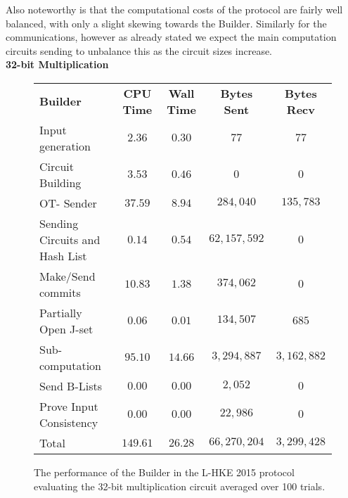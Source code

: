 \documentclass[ %
                    author={Nicholas Tutte},
                supervisor={Prof. Nigel Smart},
                    degree={MEng},
                     title={Secure Two Party Computation},
                  subtitle={A practical comparison of recent protocols},
                      type={Research - GG1K},
                      year={2015} ]{dissertation}
\begin{document}
				Also noteworthy is that the computational costs of the protocol are fairly well balanced, with only a slight skewing towards the Builder. Similarly for the communications, however as already stated we expect the main computation circuits sending to unbalance this as the circuit sizes increase.\\

				\FloatBarrier
				\noindent \textbf{32-bit Multiplication}
				\begin{figure}[!ht]
					\begin{tabular}{| p{4.3cm} | c c c c |}
						\hline
						\textbf{Builder} & \textbf{CPU Time} & \textbf{Wall Time} & \textbf{Bytes Sent} & \textbf{Bytes Recv} \\
						\thickhline
						Input generation & $2.36$ & $0.30$ & $77$ & $77$ \\
						\hline
						Circuit Building & $3.53$ & $0.46$ & $0$ & $0$ \\
						\hline
						OT- Sender & $37.59$ & $8.94$ & $284,040$ & $135,783$ \\
						\hline
						Sending Circuits and Hash List & $0.14$ & $0.54$ & $62,157,592$ & $0$ \\
						\hline
						Make/Send commits & $10.83$ & $1.38$ & $374,062$ & $0$ \\
						\hline
						Partially Open J-set & $0.06$ & $0.01$ & $134,507$ & $685$ \\
						\hline
						Sub-computation & $95.10$ & $14.66$ & $3,294,887$ & $3,162,882$\\
						\hline
						Send B-Lists & $0.00$ & $0.00$ & $2,052$ & $0$ \\
						\hline
						Prove Input Consistency & $0.00$ & $0.00$ & $22,986$ & $0$ \\
						\thickhline
						Total & $149.61$ & $26.28$ & $66,270,204$ & $3,299,428$ \\
						\hline
					\end{tabular}
					\caption{The performance of the Builder in the L-HKE 2015 protocol evaluating the 32-bit multiplication circuit averaged over 100 trials. \label{table:L-HKE_2015_Mul_Builder}}
				\end{figure}
\end{document}
